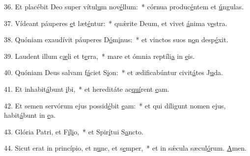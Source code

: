 36. Et placébit Deo super vítul\uline{u}m nov\uline{é}llum:~* córnua produc\uline{é}ntem et \uline{ú}ngulas.\par 
37. Vídeant páuperes \uline{e}t læt\uline{é}ntur:~* quǽrite Deum, et vivet \uline{á}nima v\uline{e}stra.\par 
38. Quóniam exaudívit páuperes D\uline{ó}m\uline{i}nus:~* et vinctos suos n\uline{o}n desp\uline{é}xit.\par 
39. Laudent illum c\uline{æ}li et t\uline{e}rra,~* mare et ómnia reptíli\uline{a} in \uline{e}is.\par 
40. Quóniam Deus salvam f\uline{á}ciet S\uline{i}on:~* et ædificabúntur civit\uline{á}tes J\uline{u}da.\par 
41. Et inhabit\uline{á}bunt \uline{i}bi,~* et hereditáte ac\uline{quí}rent \uline{e}am.\par 
42. Et semen servórum ejus possid\uline{é}bit \uline{e}am:~* et qui díligunt nomen ejus, habit\uline{á}bunt in \uline{e}a.\par 
43. Glória Patri, et F\uline{í}l\uline{i}o,~* et Spir\uline{í}tui S\uline{a}ncto.\par 
44. Sicut erat in princípio, et n\uline{u}nc, et s\uline{e}mper,~* et in sǽcula sæcul\uline{ó}rum. \uline{A}men.\par 
